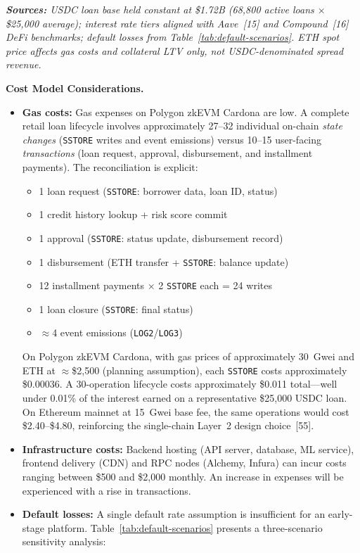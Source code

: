 \documentclass[12pt,a4paper]{report}
\begin{document}
\vspace{4pt}
\noindent\textit{\small\textbf{Sources:} USDC loan base held constant at \$1.72B (68{,}800 active loans $\times$ \$25{,}000 average); interest rate tiers aligned with Aave~[15] and Compound~[16] DeFi benchmarks; default losses from Table~\ref{tab:default-scenarios}. ETH spot price affects gas costs and collateral LTV only, not USDC-denominated spread revenue.}

\vspace{6pt}
\noindent\textbf{Cost Model Considerations.}

\begin{itemize}[noitemsep]
\item \textbf{Gas costs:} Gas expenses on Polygon zkEVM Cardona are low. A complete retail loan lifecycle involves approximately 27--32 individual on-chain \textit{state changes} (\texttt{SSTORE} writes and event emissions) versus 10--15 user-facing \textit{transactions} (loan request, approval, disbursement, and installment payments). The reconciliation is explicit:
\label{sec:gas-cost}
\begin{itemize}[noitemsep]
  \item 1 loan request (\texttt{SSTORE}: borrower data, loan ID, status)
  \item 1 credit history lookup + risk score commit
  \item 1 approval (\texttt{SSTORE}: status update, disbursement record)
  \item 1 disbursement (ETH transfer + \texttt{SSTORE}: balance update)
  \item 12 installment payments $\times$ 2 \texttt{SSTORE} each = 24 writes
  \item 1 loan closure (\texttt{SSTORE}: final status)
  \item $\approx$4 event emissions (\texttt{LOG2}/\texttt{LOG3})
\end{itemize}
On Polygon zkEVM Cardona, with gas prices of approximately 30~Gwei and ETH at $\approx$\$2{,}500 (planning assumption), each \texttt{SSTORE} costs approximately \$0.00036. A 30-operation lifecycle costs approximately \$0.011 total---well under 0.01\% of the interest earned on a representative \$25{,}000 USDC loan. On Ethereum mainnet at 15~Gwei base fee, the same operations would cost \$2.40--\$4.80, reinforcing the single-chain Layer~2 design choice~[55].
\item \textbf{Infrastructure costs:} Backend hosting (API server, database, ML service), frontend delivery (CDN) and RPC nodes (Alchemy, Infura) can incur costs ranging between \$500 and \$2,000 monthly. An increase in expenses will be experienced with a rise in transactions.
\item \textbf{Default losses:} A single default rate assumption is insufficient for an early-stage platform. Table~\ref{tab:default-scenarios} presents a three-scenario sensitivity analysis:


\end{itemize}
\end{document}
